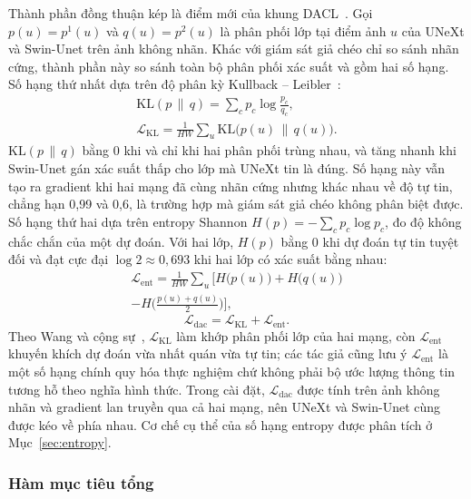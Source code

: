 \documentclass{IEEEtran}
\newcommand{\Lx}[1]{\mathcal{L}_{\mathrm{#1}}}
\newcommand{\KL}{\mathrm{KL}}
\begin{document}
Thành phần đồng thuận kép là điểm mới của khung DACL~\cite{dacl}. Gọi $p(u)=p^1(u)$ và $q(u)=p^2(u)$ là phân phối lớp tại điểm ảnh $u$ của UNeXt và Swin-Unet trên ảnh không nhãn. Khác với giám sát giả chéo chỉ so sánh nhãn cứng, thành phần này so sánh toàn bộ phân phối xác suất và gồm hai số hạng. Số hạng thứ nhất dựa trên độ phân kỳ Kullback -- Leibler~\cite{kl}:
\begin{gather}
  \KL(p\,\|\,q) = \sum_{c} p_c \log\frac{p_c}{q_c}, \label{eq:kl}\\
  \Lx{KL} = \frac{1}{HW}\sum_{u}\KL\big(p(u)\,\|\,q(u)\big). \label{eq:lkl}
\end{gather}
$\KL(p\,\|\,q)$ bằng 0 khi và chỉ khi hai phân phối trùng nhau, và tăng nhanh khi Swin-Unet gán xác suất thấp cho lớp mà UNeXt tin là đúng. Số hạng này vẫn tạo ra gradient khi hai mạng đã cùng nhãn cứng nhưng khác nhau về độ tự tin, chẳng hạn 0,99 và 0,6, là trường hợp mà giám sát giả chéo không phân biệt được. Số hạng thứ hai dựa trên entropy Shannon $H(p)=-\sum_c p_c\log p_c$, đo độ không chắc chắn của một dự đoán. Với hai lớp, $H(p)$ bằng 0 khi dự đoán tự tin tuyệt đối và đạt cực đại $\log 2\approx0{,}693$ khi hai lớp có xác suất bằng nhau:
\begin{multline}
  \Lx{ent} = \frac{1}{HW}\sum_{u}\Big[H\big(p(u)\big)+H\big(q(u)\big)\\
  -H\Big(\frac{p(u)+q(u)}{2}\Big)\Big], \label{eq:lent}
\end{multline}
\begin{equation}
  \Lx{dac} = \Lx{KL} + \Lx{ent}. \label{eq:dac}
\end{equation}
Theo Wang và cộng sự~\cite{dacl}, $\Lx{KL}$ làm khớp phân phối lớp của hai mạng, còn $\Lx{ent}$ khuyến khích dự đoán vừa nhất quán vừa tự tin; các tác giả cũng lưu ý $\Lx{ent}$ là một số hạng chính quy hóa thực nghiệm chứ không phải bộ ước lượng thông tin tương hỗ theo nghĩa hình thức. Trong cài đặt, $\Lx{dac}$ được tính trên ảnh không nhãn và gradient lan truyền qua cả hai mạng, nên UNeXt và Swin-Unet cùng được kéo về phía nhau. Cơ chế cụ thể của số hạng entropy được phân tích ở Mục~\ref{sec:entropy}.

\subsubsection{Hàm mục tiêu tổng}
\end{document}
